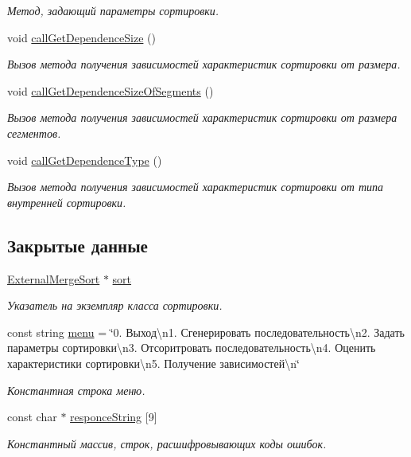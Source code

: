 \begin{DoxyCompactItemize}
\begin{DoxyCompactList}\small\item\em Метод, задающий параметры сортировки. \end{DoxyCompactList}\item 
void \hyperlink{class_user_interface_a1dc307f92c919866f13ddaf30cde1a70}{call\+Get\+Dependence\+Size} ()
\begin{DoxyCompactList}\small\item\em Вызов метода получения зависимостей характеристик сортировки от размера. \end{DoxyCompactList}\item 
void \hyperlink{class_user_interface_ab668f3b2d9f89ce3eacda5e166f33807}{call\+Get\+Dependence\+Size\+Of\+Segments} ()
\begin{DoxyCompactList}\small\item\em Вызов метода получения зависимостей характеристик сортировки от размера сегментов. \end{DoxyCompactList}\item 
void \hyperlink{class_user_interface_aa413c00a65ae4faf9421e9fc359663ec}{call\+Get\+Dependence\+Type} ()
\begin{DoxyCompactList}\small\item\em Вызов метода получения зависимостей характеристик сортировки от типа внутренней сортировки. \end{DoxyCompactList}\end{DoxyCompactItemize}
\subsection*{Закрытые данные}
\begin{DoxyCompactItemize}
\item 
\hyperlink{class_external_merge_sort}{External\+Merge\+Sort} $\ast$ \hyperlink{class_user_interface_af3405ffdb7e2834c2cf63662b5415a91}{sort}
\begin{DoxyCompactList}\small\item\em Указатель на экземпляр класса сортировки. \end{DoxyCompactList}\item 
const string \hyperlink{class_user_interface_a24b9a8a0a253382b0737a86f7ecf7d8b}{menu} = \char`\"{}0. Выход\textbackslash{}n1. Сгенерировать последовательность\textbackslash{}n2. Задать параметры сортировки\textbackslash{}n3. Отсоритровать последовательность\textbackslash{}n4. Оценить характеристики сортировки\textbackslash{}n5. Получение зависимостей\textbackslash{}n\char`\"{}
\begin{DoxyCompactList}\small\item\em Константная строка меню. \end{DoxyCompactList}\item 
const char $\ast$ \hyperlink{class_user_interface_a3ec4a2871150fd6b83ddf9d459aa0afc}{responce\+String} \mbox{[}9\mbox{]}
\begin{DoxyCompactList}\small\item\em Константный массив, строк, расшифровывающих коды ошибок. \end{DoxyCompactList}\end{DoxyCompactItemize}


